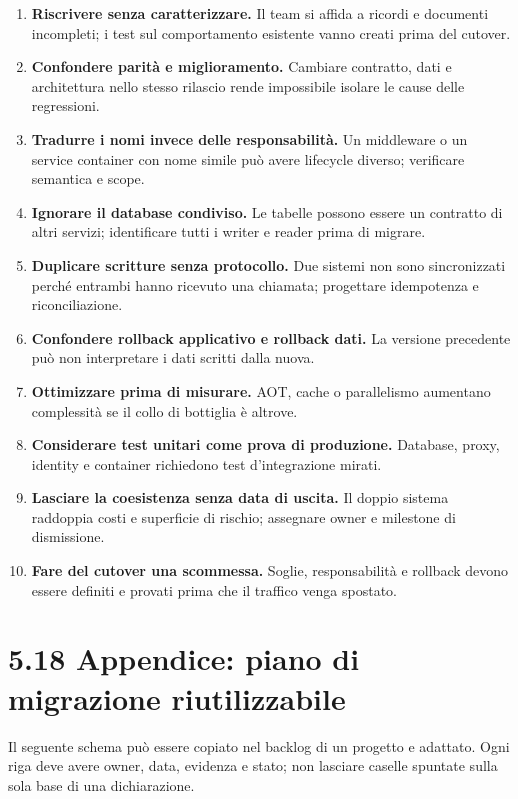 \documentclass[
  italian,
  10pt,
]{book}
\providecommand{\tightlist}{%
  \setlength{\itemsep}{0pt}\setlength{\parskip}{0pt}}
\begin{document}
\begin{enumerate}
\def\labelenumi{\arabic{enumi}.}
\tightlist
\item
  \textbf{Riscrivere senza caratterizzare.} Il team si affida a ricordi
  e documenti incompleti; i test sul comportamento esistente vanno
  creati prima del cutover.
\item
  \textbf{Confondere parità e miglioramento.} Cambiare contratto, dati e
  architettura nello stesso rilascio rende impossibile isolare le cause
  delle regressioni.
\item
  \textbf{Tradurre i nomi invece delle responsabilità.} Un middleware o
  un service container con nome simile può avere lifecycle diverso;
  verificare semantica e scope.
\item
  \textbf{Ignorare il database condiviso.} Le tabelle possono essere un
  contratto di altri servizi; identificare tutti i writer e reader prima
  di migrare.
\item
  \textbf{Duplicare scritture senza protocollo.} Due sistemi non sono
  sincronizzati perché entrambi hanno ricevuto una chiamata; progettare
  idempotenza e riconciliazione.
\item
  \textbf{Confondere rollback applicativo e rollback dati.} La versione
  precedente può non interpretare i dati scritti dalla nuova.
\item
  \textbf{Ottimizzare prima di misurare.} AOT, cache o parallelismo
  aumentano complessità se il collo di bottiglia è altrove.
\item
  \textbf{Considerare test unitari come prova di produzione.} Database,
  proxy, identity e container richiedono test d'integrazione mirati.
\item
  \textbf{Lasciare la coesistenza senza data di uscita.} Il doppio
  sistema raddoppia costi e superficie di rischio; assegnare owner e
  milestone di dismissione.
\item
  \textbf{Fare del cutover una scommessa.} Soglie, responsabilità e
  rollback devono essere definiti e provati prima che il traffico venga
  spostato.
\end{enumerate}

\section{5.18 Appendice: piano di migrazione
riutilizzabile}\label{appendice-piano-di-migrazione-riutilizzabile}

Il seguente schema può essere copiato nel backlog di un progetto e
adattato. Ogni riga deve avere owner, data, evidenza e stato; non
lasciare caselle spuntate sulla sola base di una dichiarazione.
\end{document}
